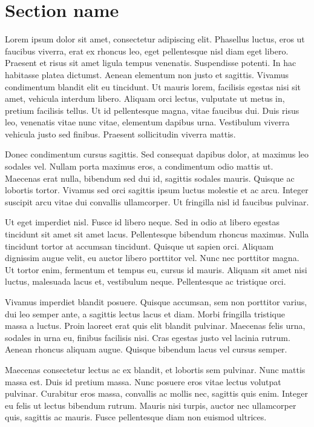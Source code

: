 \section{Section name}
Lorem ipsum dolor sit amet, consectetur adipiscing elit. Phasellus luctus, eros ut faucibus viverra, erat ex rhoncus leo, eget pellentesque nisl diam eget libero. Praesent et risus sit amet ligula tempus venenatis. Suspendisse potenti. In hac habitasse platea dictumst. Aenean elementum non justo et sagittis. Vivamus condimentum blandit elit eu tincidunt. Ut mauris lorem, facilisis egestas nisi sit amet, vehicula interdum libero. Aliquam orci lectus, vulputate ut metus in, pretium facilisis tellus. Ut id pellentesque magna, vitae faucibus dui. Duis risus leo, venenatis vitae nunc vitae, elementum dapibus urna. Vestibulum viverra vehicula justo sed finibus. Praesent sollicitudin viverra mattis.

Donec condimentum cursus sagittis. Sed consequat dapibus dolor, at maximus leo sodales vel. Nullam porta maximus eros, a condimentum odio mattis ut. Maecenas erat nulla, bibendum sed dui id, sagittis sodales mauris. Quisque ac lobortis tortor. Vivamus sed orci sagittis ipsum luctus molestie et ac arcu. Integer suscipit arcu vitae dui convallis ullamcorper. Ut fringilla nisl id faucibus pulvinar.

Ut eget imperdiet nisl. Fusce id libero neque. Sed in odio at libero egestas tincidunt sit amet sit amet lacus. Pellentesque bibendum rhoncus maximus. Nulla tincidunt tortor at accumsan tincidunt. Quisque ut sapien orci. Aliquam dignissim augue velit, eu auctor libero porttitor vel. Nunc nec porttitor magna. Ut tortor enim, fermentum et tempus eu, cursus id mauris. Aliquam sit amet nisi luctus, malesuada lacus et, vestibulum neque. Pellentesque ac tristique orci.

Vivamus imperdiet blandit posuere. Quisque accumsan, sem non porttitor varius, dui leo semper ante, a sagittis lectus lacus et diam. Morbi fringilla tristique massa a luctus. Proin laoreet erat quis elit blandit pulvinar. Maecenas felis urna, sodales in urna eu, finibus facilisis nisi. Cras egestas justo vel lacinia rutrum. Aenean rhoncus aliquam augue. Quisque bibendum lacus vel cursus semper.

Maecenas consectetur lectus ac ex blandit, et lobortis sem pulvinar. Nunc mattis massa est. Duis id pretium massa. Nunc posuere eros vitae lectus volutpat pulvinar. Curabitur eros massa, convallis ac mollis nec, sagittis quis enim. Integer eu felis ut lectus bibendum rutrum. Mauris nisi turpis, auctor nec ullamcorper quis, sagittis ac mauris. Fusce pellentesque diam non euismod ultrices. 

